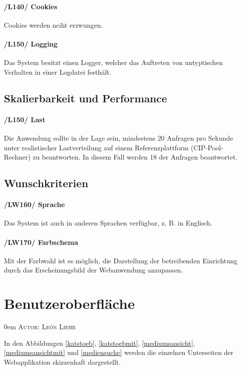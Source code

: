\documentclass{article}
\makeatletter
\newcommand{\sectionauthor}[1]{
	{\parindent 0em \large \scshape Autor: #1 \par \nobreak \vspace*{2em}}
	\@afterheading
}
\makeatother
\begin{document}
   \paragraph{/L140/ \label{L140} Cookies}
   Cookies werden nciht erzwungen.

   \paragraph{/L150/ \label{L150} Logging}
    Das System besitzt einen Logger, welcher das Auftreten von untyptischen Verhalten in einer Logdatei festhält.

 \subsection{Skalierbarkeit und Performance}
	        \paragraph{
	        /L150/ \label{L150} Last}
	       Die Anwendung sollte in der Lage sein, mindestens 20 Anfragen pro Sekunde unter realistischer Lastverteilung auf einem Referenzplattform (CIP-Pool-Rechner) zu beantworten. In diesem Fall werden 18 der Anfragen beantwortet.


\subsection{Wunschkriterien}
	    \paragraph{/LW160/ \label{LW160} Sprache}
	    Das System ist auch in anderen Sprachen verfügbar, z. B. in Englisch.

\paragraph{/LW170/ \label{LW170} Farbschema}
	       Mit der Farbwahl ist es möglich, die Darstellung der betreibenden Einrichtung durch das Erscheinungsbild der Webanwendung anzupassen.

	   \section{Benutzeroberfläche} %
\sectionauthor{León Liehr}

In den Abbildungen \ref{katstoeb}, \ref{katstoebmit}, \ref{mediumsansicht}, \ref{mediumsansichtmit} und \ref{mediensuche} werden die einzelnen Unterseiten der Webapplikation skizzenhaft dargestellt.
\end{document}
